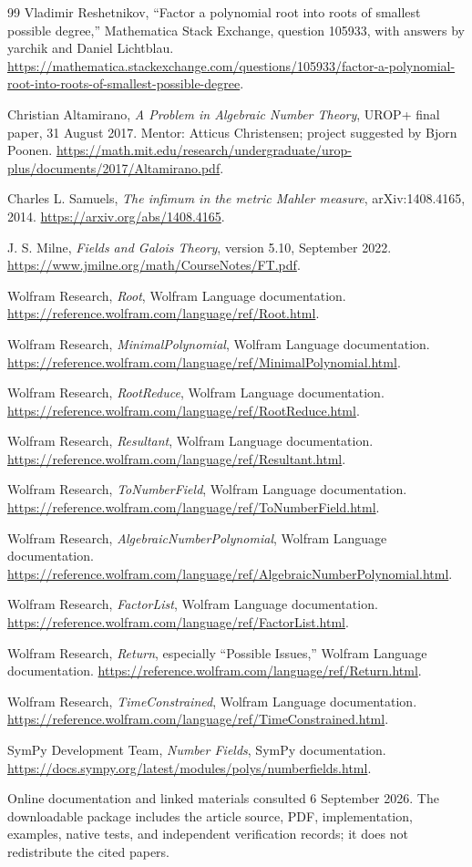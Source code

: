 \documentclass[11pt,a4paper]{article}
\theoremstyle{definition}\newtheorem{definition}[theorem]{Definition}
\theoremstyle{remark}\newtheorem{remark}[theorem]{Remark}
\begin{document}
\clearpage
\begin{thebibliography}{99}
Vladimir Reshetnikov, ``Factor a polynomial root into roots of smallest possible degree,'' Mathematica Stack Exchange, question 105933, with answers by yarchik and Daniel Lichtblau.
\url{https://mathematica.stackexchange.com/questions/105933/factor-a-polynomial-root-into-roots-of-smallest-possible-degree}.

Christian Altamirano, \emph{A Problem in Algebraic Number Theory}, UROP+ final paper, 31 August 2017. Mentor: Atticus Christensen; project suggested by Bjorn Poonen.
\url{https://math.mit.edu/research/undergraduate/urop-plus/documents/2017/Altamirano.pdf}.

Charles L. Samuels, \emph{The infimum in the metric Mahler measure}, arXiv:1408.4165, 2014.
\url{https://arxiv.org/abs/1408.4165}.

J. S. Milne, \emph{Fields and Galois Theory}, version 5.10, September 2022.
\url{https://www.jmilne.org/math/CourseNotes/FT.pdf}.

Wolfram Research, \emph{Root}, Wolfram Language documentation.
\url{https://reference.wolfram.com/language/ref/Root.html}.

Wolfram Research, \emph{MinimalPolynomial}, Wolfram Language documentation.
\url{https://reference.wolfram.com/language/ref/MinimalPolynomial.html}.

Wolfram Research, \emph{RootReduce}, Wolfram Language documentation.
\url{https://reference.wolfram.com/language/ref/RootReduce.html}.

Wolfram Research, \emph{Resultant}, Wolfram Language documentation.
\url{https://reference.wolfram.com/language/ref/Resultant.html}.

Wolfram Research, \emph{ToNumberField}, Wolfram Language documentation.
\url{https://reference.wolfram.com/language/ref/ToNumberField.html}.

Wolfram Research, \emph{AlgebraicNumberPolynomial}, Wolfram Language documentation.
\url{https://reference.wolfram.com/language/ref/AlgebraicNumberPolynomial.html}.

Wolfram Research, \emph{FactorList}, Wolfram Language documentation.
\url{https://reference.wolfram.com/language/ref/FactorList.html}.

Wolfram Research, \emph{Return}, especially ``Possible Issues,'' Wolfram Language documentation.
\url{https://reference.wolfram.com/language/ref/Return.html}.

Wolfram Research, \emph{TimeConstrained}, Wolfram Language documentation.
\url{https://reference.wolfram.com/language/ref/TimeConstrained.html}.

SymPy Development Team, \emph{Number Fields}, SymPy documentation.
\url{https://docs.sympy.org/latest/modules/polys/numberfields.html}.

\end{thebibliography}
\vspace{3mm}
{\footnotesize Online documentation and linked materials consulted 6 September 2026. The downloadable package includes the article source, PDF, implementation, examples, native tests, and independent verification records; it does not redistribute the cited papers.}
\end{document}
